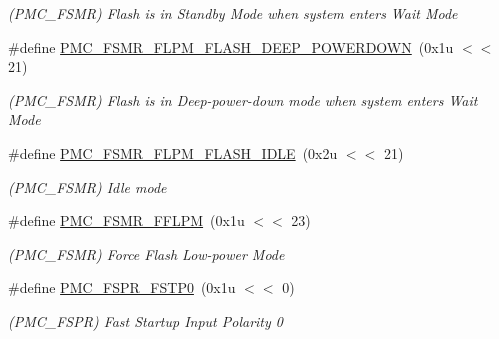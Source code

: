 \begin{DoxyCompactItemize}
\begin{DoxyCompactList}\small\item\em (P\+M\+C\+\_\+\+F\+S\+MR) Flash is in Standby Mode when system enters Wait Mode \end{DoxyCompactList}\item 
\mbox{\label{group__SAME70__PMC_gac9ac32beca66e3facdd728f767c05947}} 
\#define \mbox{\hyperlink{group__SAME70__PMC_gac9ac32beca66e3facdd728f767c05947}{P\+M\+C\+\_\+\+F\+S\+M\+R\+\_\+\+F\+L\+P\+M\+\_\+\+F\+L\+A\+S\+H\+\_\+\+D\+E\+E\+P\+\_\+\+P\+O\+W\+E\+R\+D\+O\+WN}}~(0x1u $<$$<$ 21)
\begin{DoxyCompactList}\small\item\em (P\+M\+C\+\_\+\+F\+S\+MR) Flash is in Deep-\/power-\/down mode when system enters Wait Mode \end{DoxyCompactList}\item 
\mbox{\label{group__SAME70__PMC_gae770c6c0b02343c3c8f0f3adb16ef28f}} 
\#define \mbox{\hyperlink{group__SAME70__PMC_gae770c6c0b02343c3c8f0f3adb16ef28f}{P\+M\+C\+\_\+\+F\+S\+M\+R\+\_\+\+F\+L\+P\+M\+\_\+\+F\+L\+A\+S\+H\+\_\+\+I\+D\+LE}}~(0x2u $<$$<$ 21)
\begin{DoxyCompactList}\small\item\em (P\+M\+C\+\_\+\+F\+S\+MR) Idle mode \end{DoxyCompactList}\item 
\mbox{\label{group__SAME70__PMC_gaecef669ce38e5456c894881c59b6e904}} 
\#define \mbox{\hyperlink{group__SAME70__PMC_gaecef669ce38e5456c894881c59b6e904}{P\+M\+C\+\_\+\+F\+S\+M\+R\+\_\+\+F\+F\+L\+PM}}~(0x1u $<$$<$ 23)
\begin{DoxyCompactList}\small\item\em (P\+M\+C\+\_\+\+F\+S\+MR) Force Flash Low-\/power Mode \end{DoxyCompactList}\item 
\mbox{\label{group__SAME70__PMC_ga813b8b86e05864b604df5c1285ba13da}} 
\#define \mbox{\hyperlink{group__SAME70__PMC_ga813b8b86e05864b604df5c1285ba13da}{P\+M\+C\+\_\+\+F\+S\+P\+R\+\_\+\+F\+S\+T\+P0}}~(0x1u $<$$<$ 0)
\begin{DoxyCompactList}\small\item\em (P\+M\+C\+\_\+\+F\+S\+PR) Fast Startup Input Polarity 0 \end{DoxyCompactList}\item 

\end{DoxyCompactItemize}
